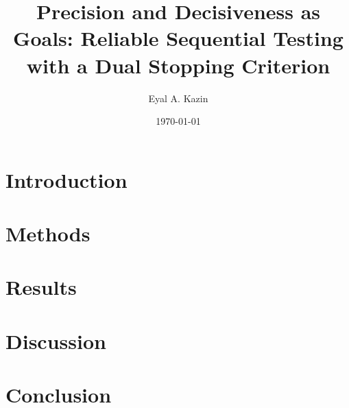 \documentclass{article}
\title{Precision and Decisiveness as Goals: Reliable Sequential Testing with a Dual Stopping Criterion}
\date{\today}
\author{Eyal A. Kazin}
\begin{document}
\maketitle



%

\section{Introduction}




\section{Methods}\label{sec:methods}



\section{Results}\label{sec:results}



\section{Discussion}\label{sec:discussion}


\section{Conclusion}\label{sec:conclusion}


\appendix











%

%



\end{document}
